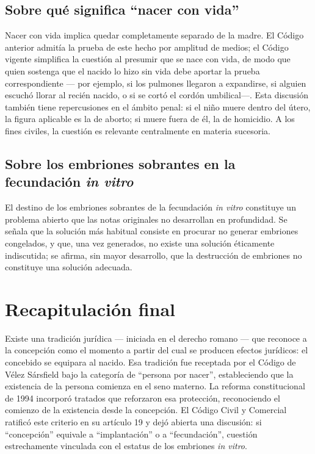 \documentclass[12pt,oneside]{book}
\begin{document}
\subsection{Sobre qué significa ``nacer con vida''}

Nacer con vida implica quedar completamente separado de la madre. El Código anterior admitía la prueba de este hecho por amplitud de medios; el Código vigente simplifica la cuestión al presumir que se nace con vida, de modo que quien sostenga que el nacido lo hizo sin vida debe aportar la prueba correspondiente --- por ejemplo, si los pulmones llegaron a expandirse, si alguien escuchó llorar al recién nacido, o si se cortó el cordón umbilical---. Esta discusión también tiene repercusiones en el ámbito penal: si el niño muere dentro del útero, la figura aplicable es la de aborto; si muere fuera de él, la de homicidio. A los fines civiles, la cuestión es relevante centralmente en materia sucesoria.

\subsection{Sobre los embriones sobrantes en la fecundación \textit{in vitro}}

El destino de los embriones sobrantes de la fecundación \textit{in vitro} constituye un problema abierto que las notas originales no desarrollan en profundidad. Se señala que la solución más habitual consiste en procurar no generar embriones congelados, y que, una vez generados, no existe una solución éticamente indiscutida; se afirma, sin mayor desarrollo, que la destrucción de embriones no constituye una solución adecuada.

\section{Recapitulación final}

Existe una tradición jurídica --- iniciada en el derecho romano --- que reconoce a la concepción como el momento a partir del cual se producen efectos jurídicos: el concebido se equipara al nacido. Esa tradición fue receptada por el Código de Vélez Sársfield bajo la categoría de ``persona por nacer'', estableciendo que la existencia de la persona comienza en el seno materno. La reforma constitucional de 1994 incorporó tratados que reforzaron esa protección, reconociendo el comienzo de la existencia desde la concepción. El Código Civil y Comercial ratificó este criterio en su artículo 19 y dejó abierta una discusión: si ``concepción'' equivale a ``implantación'' o a ``fecundación'', cuestión estrechamente vinculada con el estatus de los embriones \textit{in vitro}.
\end{document}
